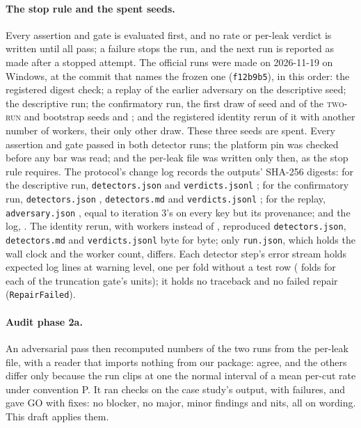 \documentclass[11pt]{article}
\newcommand{\code}[1]{\texttt{#1}}
\newcommand{\TR}{\textsc{two-run}}
\begin{document}
\paragraph{The stop rule and the spent seeds.} Every assertion and gate is evaluated first, and no
rate or per-leak verdict is written until all pass; a failure stops the run, and the next run is
reported as made after a stopped attempt. The official runs were made on 2026-11-19 on Windows, at
the commit that names the frozen one (\code{f12b9b5}), in this order: the registered digest check;
a replay of the earlier adversary on the descriptive seed; the descriptive run; the confirmatory
run, the first draw of seed \NumConfSeed{} and of the \TR{} and bootstrap seeds
\NumTwoRunSeed{} and \NumBootSeed; and the registered identity rerun of it with another number of workers, their only other draw.
These three seeds are spent. Every assertion and gate passed in both detector runs; the platform
pin was checked before any bar was read; and the per-leak file was written only then, as the stop
rule requires. The protocol's change log records the outputs' SHA-256 digests: for the descriptive
run, \code{detectors.json} \NumWdescJsonSha{} and \code{verdicts.jsonl} \NumWdescVerdSha; for the
confirmatory run, \code{detectors.json} \NumWconfJsonSha, \code{detectors.md} \NumWconfMdSha{} and
\code{verdicts.jsonl} \NumWconfVerdSha; for the replay, \code{adversary.json} \NumWreplaySha, equal to
iteration 3's on every key but its provenance; and the log, \NumWlogSha. The identity rerun, with
\NumRerunWorkers{} workers instead of \NumConfWorkers, reproduced \code{detectors.json},
\code{detectors.md} and \code{verdicts.jsonl} byte for byte; only \code{run.json}, which holds the
wall clock and the worker count, differs. Each detector step's error stream holds
\NumStderrLines{} expected log lines at warning level, one per fold without a test row
(\NumStderrFolds{} folds for each of the truncation gate's \NumStderrUnits{} units); it holds no
traceback and no failed repair (\code{RepairFailed}).

\paragraph{Audit phase 2a.} An adversarial pass then recomputed \NumRecompNumbers{} numbers of the
two runs from the per-leak file, with a reader that imports nothing from our package:
\NumRecompAgree{} agree, and the \NumRecompOther{} others differ only because the run clips at one
the normal interval of a mean per-cut rate under convention P. It ran \NumCaseChecks{} checks on the
case study's output, with \NumCaseFailed{} failures, and gave GO with fixes: no blocker, no major,
\NumAtwoaMinor{} minor findings and \NumAtwoaNit{} nits, all on wording. This draft applies them.
\end{document}
